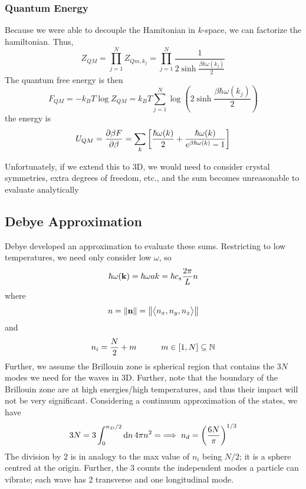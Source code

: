 \subsubsection{Quantum Energy}
Because we were able to decouple the Hamitonian in \(k\)-space, we can factorize the hamiltonian. Thus,
\begin{equation}
	Z_{QM} = \prod_{j=1}^N Z_{Qm, k_j} = \prod_{j=1}^N \frac{1}{2\sinh\frac{\beta\hbar\omega(k_j)}{2}}
\end{equation}
The quantum free energy is then
\begin{equation}
	F_{QM} = -k_BT\log Z_{QM} = k_BT\sum_{j=1}^N\log\left(2\sinh \frac{\beta\hbar\omega(k_j)}{2}\right)
\end{equation}
the energy is
\begin{equation}
	U_{QM} = \frac{\partial \beta F}{\partial \beta}= \sum_k \left[\frac{\hbar\omega(k)}{2}+\frac{\hbar\omega(k)}{e^{\beta\hbar\omega(k)}-1}\right]
\end{equation}

Unfortunately, if we extend this to 3D, we would need to consider crystal symmetries, extra degrees of freedom, etc., and the sum becomes unreasonable to evaluate analytically
\subsection{Debye Approximation}
Debye developed an approximation to evaluate these sums. Restricting to low temperatures, we need only consider low \(\omega\), so
\[\hbar\omega(\mathbf{k}) = \hbar\omega ak = \hbar c_s \frac{2\pi}{L}n\]
where
\[n = \left\lVert\mathbf{n}\right\rVert = \left\lVert\left\langle \begin{matrix}n_x, n_y, n_z\end{matrix} \right\rangle\right\rVert\]
and 
\[n_i = \frac{N}{2}+m\quad\qquad m\in[1,N]\subseteq \mathbb{N}\]
Further, we assume the Brillouin zone is spherical region that contains the \(3N\) modes we need for the waves in 3D. Further, note that the boundary of the Brillouin zone are at high energies/high temperatures, and thus their impact will not be very significant. Considering a continuum approximation of the states, we have
\[3N = 3\int_0^{n_D/2}\d{n}4\pi n^2= \then n_d = \left(\frac{6N}{\pi}\right)^{1/3} \]
The division by \(2\) is in analogy to the max value of \(n_i\) being \(N/2\); it is a sphere centred at the origin. Further, the \(3\) counts the independent modes a particle can vibrate; each wave has 2 transverse and one longitudinal mode.

